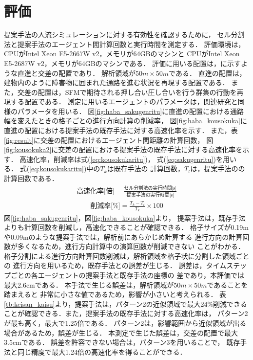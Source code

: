\documentclass{maelab_y}
\newcommand{\分類条件}{%
\begin{table}[t]
\begin{center}
\caption{進行方向を分類する条件}
\ecaption{Classification condition of moving direction $e_{i}$.}
\label{tb:hantei_jouken}
\begin{tabular}{c|c|c|c|c}
\hline \hline
			& 右 & 左 & 上 & 下 \\ \hline
パターン2   & $\frac{1}{\sqrt{2}} < e_x \leq 1  $
		    & $ -1 \leq e_x < \frac{-1}{\sqrt{2}}$ 
		    & $ \frac{-1}{\sqrt{2}} < e_x < \frac{1}{\sqrt{2}} $ 
		    & $ \frac{-1}{2} < e_x < \frac{1}{2} $ \\
パターン3   & $\frac{-1}{2} < e_y < \frac{1}{2} $ 
		    & $\frac{-1}{2} < e_y < \frac{1}{2} $
            & $ \frac{1}{\sqrt{2}} < e_y \leq 1$
		    & $ -1 \leq e_y < \frac{-1}{\sqrt{2}} $ \\
\hline
\multirow{2}{*}{パターン4}   
			& $R_x \geq A_x$ & $R_x < A_x$ & $R_y \geq A_y$ & $R_y < A_y $ \\
	        &  $L_x \geq A_x$ & $L_x < A_x$ & $L_y \geq A_y$ & $L_y < A_y$ \\
\hline
\multirow{2}{*}{パターン5}   
 			& $R_x \geq x_1$ & $R_x < x_2$ & $R_y \geq y_1$ & $R_y < y_2 $ \\
			& $L_x \geq x_1$ & $L_x < x_2$ & $L_y \geq y_1$ & $L_y < y_2 $ \\
\hline
パターン6   & $ \cos(\frac{1}{2}\theta_{view}) \leq  e_y $ 
			& $ e_y \leq -\cos(\frac{1}{2}\theta_{view})$ 
			& $ \sin(\frac{1}{2}(\pi - \theta_{view})) \leq e_x $ 
			& $ e_x \leq \sin(\frac{1}{2}(\pi - \theta_{view}))  $ \\
\hline
\end{tabular}
\end{center}
\end{table}
}%
\newcommand{\距離計算new}{%
  \begin{table}[hbtp]
    \begin{center}
    \caption{エージェント間距離の計算回数[$10^{10}$回]}
    \label{tb:keisan_kaisu}
    \begin{tabular}{c|llllll}
    \hline \hline
    \multirow{2}{*}{人数}   & \multicolumn{6}{c}{パターン}                                                                                                                                                             \\ \cline{2-7} 
                          & \multicolumn{1}{c|}{1}    & \multicolumn{1}{c|}{2}               & \multicolumn{1}{c|}{3}      & \multicolumn{1}{c|}{4}      & \multicolumn{1}{c|}{5}      & \multicolumn{1}{c}{6}    \\ \hline
    \multirow{2}{*}{3000} & \multicolumn{1}{r|}{5.1}  & \multicolumn{1}{r|}{\textbf{3.9}}    & \multicolumn{1}{r|}{4.0}    & \multicolumn{1}{r|}{4.4}    & \multicolumn{1}{r|}{4.1}    & \multicolumn{1}{r}{4.4}  \\
                          & \multicolumn{1}{l|}{}     & \multicolumn{1}{l|}{\textbf{(24\%)}} & \multicolumn{1}{l|}{(23\%)} & \multicolumn{1}{l|}{(15\%)} & \multicolumn{1}{l|}{(21\%)} & (15\%)                   \\ \hline
    \multirow{2}{*}{5000} & \multicolumn{1}{r|}{14.4} & \multicolumn{1}{r|}{\textbf{10.9}}   & \multicolumn{1}{r|}{11.1}   & \multicolumn{1}{r|}{12.2}   & \multicolumn{1}{r|}{11.4}   & \multicolumn{1}{r}{12.2} \\
                          & \multicolumn{1}{l|}{}     & \multicolumn{1}{l|}{\textbf{(24\%)}} & \multicolumn{1}{l|}{(23\%)} & \multicolumn{1}{l|}{(15\%)} & \multicolumn{1}{l|}{(21\%)} & (15\%)                   \\ \hline
    \multirow{2}{*}{7500} & \multicolumn{1}{r|}{33.1} & \multicolumn{1}{r|}{\textbf{25.2}}   & \multicolumn{1}{r|}{25.8}   & \multicolumn{1}{r|}{28.3}   & \multicolumn{1}{r|}{26.7}   & \multicolumn{1}{r}{28.3} \\
                          & \multicolumn{1}{l|}{}     & \multicolumn{1}{l|}{\textbf{(24\%)}} & \multicolumn{1}{l|}{(22\%)} & \multicolumn{1}{l|}{(15\%)} & \multicolumn{1}{l|}{(20\%)} & (15\%)                   \\ \hline
    \end{tabular}
    \end{center}
    \end{table}
}%
\newcommand{\粒子数}{%
\begin{table}[hbtp]
  \begin{center}
    \caption{各配置の詳細}
    \label{tb:haichi_para}
    \begin{tabular}{c|c|c}
      \hline \hline
      & 教室 & 演習室 \\ \hline 
      エージェント数[人] & 96 & 204 \\ \hline
      壁粒子数[個] & 1037 & 1454\\ \hline
      経由地数[個] & 12   & 26 \\ \hline
      解析領域 & $50m\times50m$ & $50m\times50m$ \\ \hline
    \end{tabular}
  \end{center}
\end{table}
}%
\newcommand{\評価環境}{%
\begin{table}[hbtp]
  \begin{center}
    \caption{各配置の詳細}
    \label{tb:haichi_para}
    \begin{tabular}{c|c|c}
      \hline \hline
                 & マシン1                & マシン2 \\ \hline 
      CPU        & Intel Xeon E5-2687W & Intel Xeon E5-2667W \\ \hline
      メモリ     & 64GB                   & 64GB \\ \hline
      OS         & Linux 4.12.9            & Linux 6.5.8 \\ \hline
      コンパイラ & gcc 7.2.0             & gcc 13.2.0 \\ \hline
    \end{tabular}
  \end{center}
\end{table}
}%
\newcommand{\判定条件new}{%
  \begin{table}[hbtp]
    \centering
		\caption{パターンごとの進行方向分類条件}
		\label{tb:joken}
		{\scriptsize
    \begin{tabular}{Wc{0.5em}|cccWc{8em}}
    \hline \hline
                          & \multicolumn{1}{c|}{パターン2，3} & \multicolumn{1}{c|}{パターン4}   & \multicolumn{1}{c|}{パターン5}   & パターン6                   \\ \hline
    \multirow{2}{*}{右}    & \multicolumn{1}{c|}{$\frac{1}{\sqrt{2}} < e_x \leq 1$}  & \multicolumn{1}{c|}{$R_x \geq A_x$}  & \multicolumn{1}{c|}{$R_x \geq x_1$}  & \multirow{2}{*}{$ \cos(\frac{1}{2}\theta_v) \leq  e_y $} \\
                          & \multicolumn{1}{c|}{$\frac{-1}{2} < e_y < \frac{1}{2} $}   & \multicolumn{1}{l|}{$L_x \geq A_x$} & \multicolumn{1}{l|}{$L_x \geq x_1$} &                     \\ \hline
    \multirow{2}{*}{左}    & \multicolumn{1}{c|}{$ -1 \leq e_x < \frac{-1}{\sqrt{2}}$}  & \multicolumn{1}{c|}{$R_x < A_x$}  & \multicolumn{1}{c|}{$R_x < x_2$}  & \multirow{2}{*}{$ e_y \leq -\cos(\frac{1}{2}\theta_{v})$} \\
                          & \multicolumn{1}{l|}{$\frac{-1}{2} < e_y < \frac{1}{2} $}   & \multicolumn{1}{l|}{$L_x < A_x$} & \multicolumn{1}{l|}{$L_x < x_2$ } &                     \\ \hline
    \multirow{2}{*}{上}    & \multicolumn{1}{c|}{$ \frac{-1}{\sqrt{2}} < e_x < \frac{1}{\sqrt{2}}$}  & \multicolumn{1}{c|}{$R_y \geq A_y$ }  & \multicolumn{1}{c|}{$R_y \geq y_1$ }  & \multirow{2}{*}{$ \sin(\frac{1}{2}(\theta_{\pi - v})) \leq e_x$} \\
                          & \multicolumn{1}{l|}{$ \frac{1}{\sqrt{2}} < e_y \leq 1$}   & \multicolumn{1}{l|}{$L_y \geq A_y$} & \multicolumn{1}{l|}{$L_y \geq y_1$} &                     \\ \hline
    \multirow{2}{*}{下}    & \multicolumn{1}{c|}{$ \frac{-1}{2} < e_x < \frac{1}{2} $}  & \multicolumn{1}{c|}{$R_y < A_y $}  & \multicolumn{1}{c|}{$R_y < y_2 $ }  & \multirow{2}{*}{$ e_x \leq \sin(\frac{1}{2}(\theta_{\pi - v}))$} \\
                          & \multicolumn{1}{l|}{$ -1 \leq e_y < \frac{-1}{\sqrt{2}} $}   & \multicolumn{1}{l|}{$L_y < A_y$} & \multicolumn{1}{l|}{$L_y < y_2 $ } &                     \\ \hline
    \end{tabular}
		}
    \end{table}
}%
\begin{document}
\section{評価}
提案手法の人流シミュレーションに対する有効性を確認するために，
セル分割法と提案手法のエージェント間計算回数と実行時間を測定する．
評価環境は，CPUがIntel Xeon E5-2667W v2，メモリが64GBのマシンと
CPUがIntel Xeon E5-2687W v2，メモリが64GBのマシンである．
評価に用いる配置は，に示すような直進と交差の配置であり．
解析領域が$50m\times50m$である．
直進の配置は，建物内のように障害物に囲まれた通路を進む状況を再現する配置である．
また，交差の配置は，SFMで期待される押し合い圧し合いを行う群集の行動を再現する配置である．
測定に用いるエージェントのパラメータは，関連研究\cite{helbing_sfm}と同様のパラメータを用いる．
図\ref{fig:haba_sakugenritu}に直進の配置における通路幅を変えたときの格子ごとの進行方向計算の削減率，
図\ref{fig:haba_kousokuka}に直進の配置における提案手法の既存手法に対する高速化率を示す．
また，表\ref{fig:result}に交差の配置におけるエージェント間距離の計算回数，
図\ref{fig:kousokuka2}に交差の配置における提案手法の既存手法に対する高速化率を示す．
%
高速化率，削減率は式(\ref{eq:kousokukaritu})，
式(\ref{eq:sakugenritu})を用いる．
式(\ref{eq:kousokukaritu})中の$T_{k}$は既存手法の
計算回数，$T_{t}$は，提案手法のの計算回数である．
%
\begin{eqnarray}
  \label{eq:kousokukaritu}
  \mbox{高速化率[倍]} =
  \frac{\mbox{セル分割法の実行時間[s]}}{\mbox{提案手法の実行時間[s]}}
\end{eqnarray}
%
\begin{eqnarray}
  \label{eq:sakugenritu}
  \mbox{削減率[\%]} =
  \frac{T_{k} - T_{t}}{T_{k}} \times 100
\end{eqnarray}\vspace{1mm}
%
図\ref{fig:haba_sakugenritu}，図\ref{fig:haba_kousokuka}より，
提案手法は，既存手法よりも計算回数を削減し，高速化できることが確認できる．
格子サイズが0.19mや0.09mのような提案手法では，解析前にあらかじめ計算する
進行方向の計算回数が多くなるため，進行方向計算中の演算回数が削減できない
ことがわかる．
格子分割による進行方向計算回数削減は，解析領域を格子状に分割した領域ごとの
進行方向を用いるため，既存手法との誤差が生じる．
誤差は，タイムステップごとの各エージェントの提案手法と既存手法の座標の
差であり，本評価では最大2.6cmである．
本手法で生じる誤差は，解析領域が$50m\times50m$であることを踏まえると
非常に小さな値であるため，影響が小さいと考えられる．
表\ref{tb:keisan_kaisu}より，提案手法は，パターン2の近似領域で最大24\%削減できる
ことが確認できる．また，提案手法の既存手法に対する高速化率は，
パターン2が最も高く，最大で1.25倍である．
パターン2は，影響範囲から近似領域が出る場合があるため，誤差が生じる．
本測定で生じた誤差は，交差の配置で最大3.5cmである．
誤差を許容できない場合は，パターン3を用いることで，
既存手法と同じ精度で最大1.24倍の高速化率を得ることができる．
\end{document}
